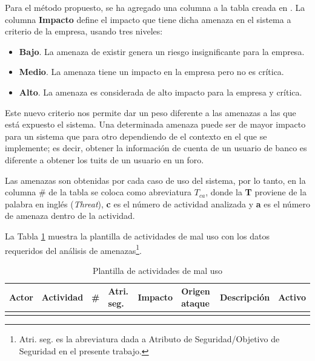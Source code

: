 Para el método propuesto, se ha agregado una columna a la tabla creada en \cite{BraFerVan08}. La columna \textbf{Impacto} define el impacto que tiene dicha amenaza en el sistema a criterio de la empresa, usando tres niveles:

\begin{itemize}[noitemsep]
	\item \textbf{Bajo}. La amenaza de existir genera un riesgo insignificante para la empresa.
	\item \textbf{Medio}. La amenaza tiene un impacto en la empresa pero no es crítica. 
	\item \textbf{Alto}. La amenaza es considerada de alto impacto para la empresa y crítica.
\end{itemize}

Este nuevo criterio nos permite dar un peso diferente a las amenazas a las que está expuesto el sistema. Una determinada amenaza puede ser de mayor impacto para un sistema que para otro dependiendo de el contexto en el que se implemente; es decir, obtener la información de cuenta de un usuario de banco es diferente a obtener los tuits de un usuario en un foro.

\vspace{0.3cm}

Las amenazas son obtenidas por cada caso de uso del sistema, por lo tanto, en la columna \# de la tabla se coloca como abreviatura $T_{ca}$, donde la \textbf{T} proviene de la palabra en inglés (\textit{Threat}), \textbf{c} es el número de actividad analizada y \textbf{a} es el número de amenaza dentro de la actividad.

\vspace{0.3cm}

La Tabla \ref{misAct_ex} muestra la plantilla de actividades de mal uso con los datos requeridos del análisis de amenazas\footnote{Atri. seg. es la abreviatura dada a Atributo de Seguridad/Objetivo de Seguridad en el presente trabajo.}. 

\begin{table}[!ht]
\caption{Plantilla de actividades de mal uso}
\begin{center}
\scriptsize{
\begin{tabular}{ |m{1cm}|m{1.5cm}|m{0.5cm}|m{0.5cm}|m{1.3cm}|m{1cm}|m{1.7cm}|m{1cm}|}
\hline
	\cellcolor{lightgray}\textbf{Actor} &\cellcolor{lightgray} \textbf{Actividad} & \cellcolor{lightgray}\textbf{\#} &\cellcolor{lightgray} \textbf{Atri. seg.} &\cellcolor{lightgray}\textbf{Impacto} & \cellcolor{lightgray}\textbf{Origen ataque} &\cellcolor{lightgray} \textbf{Descripción} &\cellcolor{lightgray} \textbf{Activo} \\ \hline
	&&&&&&&\\\hline
\end{tabular}
}
\end{center}
\label{misAct_ex}
\end{table}

